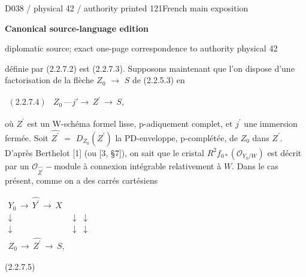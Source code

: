 \documentclass[9pt]{article}
\newcommand{\CanonText}[1]{\par{\fontsize{8.0}{9.35}\selectfont\RaggedRight #1\par}\vspace{2.2pt}}
\newenvironment{CanonMathBlock}{\par\vspace{1.2pt}\begin{center}\fontsize{6.8}{8.0}\selectfont\(\displaystyle}{\)\end{center}\vspace{1.2pt}}
\newcommand{\LayerTitle}{Canonical source-language edition}
\begin{document}
\newpage
\noindent\begin{minipage}[t][\dimexpr\textheight-5pt\relax][t]{\textwidth}
{\sffamily\fontsize{7.3}{8.2}\selectfont\color{Quiet} D038 / physical 42 / authority printed 121\hfill French main exposition}
\par{}\vspace{4.5pt}
{\sffamily\fontsize{10.4}{11.6}\selectfont\bfseries\color{Accent} \LayerTitle}
\par{\sffamily\fontsize{6.7}{7.7}\selectfont\color{Quiet} diplomatic source; exact one-page correspondence to authority physical 42}
\vspace{5pt}
\CanonText{définie par (2.2.7.2) est (2.2.7.3). Supposons maintenant que l'on dispose d'une factorisation de la flèche \(Z_{0}\) \(\to{}\) \(S\) de (2.2.5.3) en}
\begin{CanonMathBlock}
\begin{array}{cc}
(2.2.7.4) & Z_{0}\,\text{---}j'\to{}\,Z^{\prime}\,\to{}\,S,
\end{array}
\end{CanonMathBlock}
\CanonText{où \(Z^{\prime}\) est un W-schéma formel lisse, p-adiquement complet, et \(j^{\prime}\) une immersion fermée. Soit \(\widehat{Z^{\prime}}\) \(=\) \(D_{Z_{0}}(Z^{\prime})\) la PD-enveloppe, p-complétée, de \(Z_{0}\) dans \(Z^{\prime}\). D'après Berthelot [1] (ou [3, §7]), on sait que le cristal \(R^{2}f_{0*}(\mathcal{O}_{Y_{0}/W})\) est décrit par un \(\mathcal{O}_{\widehat{Z^{\prime}}}-\text{module}\) à connexion intégrable relativement à \(W\). Dans le cas présent, comme on a des carrés cartésiens}
\begin{CanonMathBlock}
\begin{array}{ccc}
Y_{0}\,\longrightarrow{}\,\widehat{Y^{\prime}}\,\longrightarrow{}\,X & {} & {}\\
\downarrow{} & \downarrow{} & \downarrow{}\\
\downarrow{} & \downarrow{} & \downarrow{}\\
Z_{0}\,\longrightarrow{}\,\widehat{Z^{\prime}}\,\longrightarrow{}\,S, & {} & {}
\end{array}
\end{CanonMathBlock}
\CanonText{(2.2.7.5)}

\end{minipage}
\end{document}
